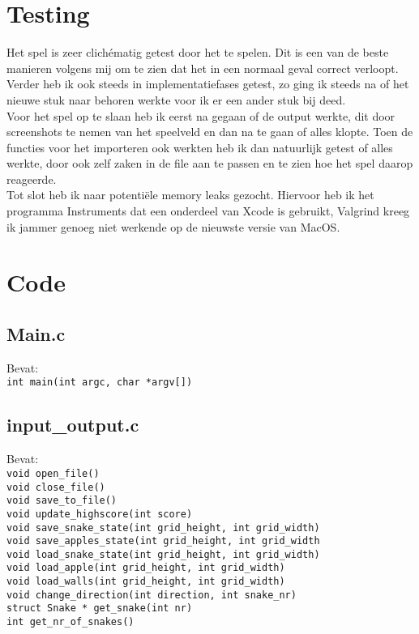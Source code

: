 \documentclass[11pt, oneside]{article}   	%
\begin{document}
\section{Testing}
Het spel is zeer clich\'{e}matig getest door het te spelen. Dit is een van de beste manieren volgens mij om te zien dat het in een normaal geval correct verloopt. Verder heb ik ook steeds in implementatiefases getest, zo ging ik steeds na of het nieuwe stuk naar behoren werkte voor ik er een ander stuk bij deed. \\
Voor het spel op te slaan heb ik eerst na gegaan of de output werkte, dit door screenshots te nemen van het speelveld en dan na te gaan of alles klopte. Toen de functies voor het importeren ook werkten heb ik dan natuurlijk getest of alles werkte, door ook zelf zaken in de file aan te passen en te zien hoe het spel daarop reageerde. \\
Tot slot heb ik naar potenti\"{e}le memory leaks gezocht. Hiervoor heb ik het programma Instruments dat een onderdeel van Xcode is gebruikt, Valgrind kreeg ik jammer genoeg niet werkende op de nieuwste versie van MacOS.
\section{Code}
 \subsection{Main.c}
Bevat: \\
\texttt{int main(int argc, char *argv[])}
\subsection{input\_output.c}
Bevat: \\
\texttt{void open\_file()} \\
\texttt{void close\_file()} \\
\texttt{void save\_to\_file()} \\
\texttt{void update\_highscore(int score)} \\
\texttt{void save\_snake\_state(int grid\_height, int grid\_width)} \\
\texttt{void save\_apples\_state(int grid\_height, int grid\_width} \\
\texttt{void load\_snake\_state(int grid\_height, int grid\_width)} \\
\texttt{void load\_apple(int grid\_height, int grid\_width)} \\
\texttt{void load\_walls(int grid\_height, int grid\_width)} \\
\texttt{void change\_direction(int direction, int snake\_nr)} \\
\texttt{struct Snake * get\_snake(int nr)} \\
\texttt{int get\_nr\_of\_snakes()}
\end{document}
